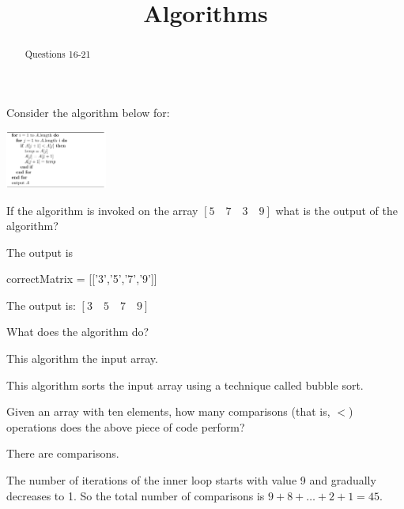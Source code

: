 \documentclass{ximera}
\title{Algorithms}
\begin{document}
\begin{abstract}
  Questions 16-21
\end{abstract}
\maketitle


Consider the algorithm below for: 

\begin{image}
\includegraphics[width=0.25\textwidth]{algo2.png}
\end{image}


\begin{question}
If the algorithm is invoked on the array $[ 5\quad 7\quad 3\quad 9]$ what is the output of the algorithm?
\begin{solution}
The output is 
\begin{matrix-answer}[name=M]
    correctMatrix = [['3','5','7','9']]
\end{matrix-answer}
\end{solution}

The output is:
$ [3 \quad 5 \quad 7 \quad 9] $
\end{question}

\begin{question}
What does the algorithm do? 
\begin{solution}
This algorithm  the input array.
\end{solution}
This algorithm sorts the input array using a technique called bubble sort.
\end{question}

\begin{question}
Given an array with ten elements, how many comparisons (that is, $<$)
operations does the above piece of code perform?
\begin{solution}
There are  comparisons.
\end{solution}  
The number of iterations of the inner loop starts with value 9 and
gradually decreases to 1. So the total number of comparisons is $ 9 +
8 + \ldots + 2 + 1 = 45$.
\end{question}
\end{document}
